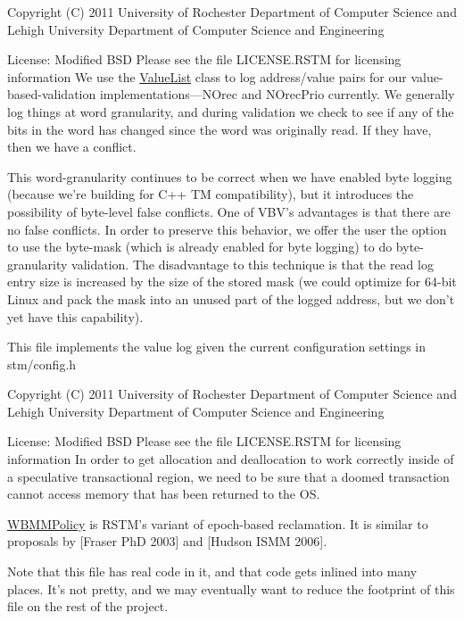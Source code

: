 Copyright (C) 2011 University of Rochester Department of Computer Science and Lehigh University Department of Computer Science and Engineering

License\-: Modified B\-S\-D Please see the file L\-I\-C\-E\-N\-S\-E.\-R\-S\-T\-M for licensing information We use the \hyperlink{structstm_1_1ValueList}{Value\-List} class to log address/value pairs for our value-\/based-\/validation implementations---N\-Orec and N\-Orec\-Prio currently. We generally log things at word granularity, and during validation we check to see if any of the bits in the word has changed since the word was originally read. If they have, then we have a conflict.

This word-\/granularity continues to be correct when we have enabled byte logging (because we're building for C++ T\-M compatibility), but it introduces the possibility of byte-\/level false conflicts. One of V\-B\-V's advantages is that there are no false conflicts. In order to preserve this behavior, we offer the user the option to use the byte-\/mask (which is already enabled for byte logging) to do byte-\/granularity validation. The disadvantage to this technique is that the read log entry size is increased by the size of the stored mask (we could optimize for 64-\/bit Linux and pack the mask into an unused part of the logged address, but we don't yet have this capability).

This file implements the value log given the current configuration settings in stm/config.\-h

Copyright (C) 2011 University of Rochester Department of Computer Science and Lehigh University Department of Computer Science and Engineering

License\-: Modified B\-S\-D Please see the file L\-I\-C\-E\-N\-S\-E.\-R\-S\-T\-M for licensing information In order to get allocation and deallocation to work correctly inside of a speculative transactional region, we need to be sure that a doomed transaction cannot access memory that has been returned to the O\-S.

\hyperlink{classstm_1_1WBMMPolicy}{W\-B\-M\-M\-Policy} is R\-S\-T\-M's variant of epoch-\/based reclamation. It is similar to proposals by \mbox{[}Fraser Ph\-D 2003\mbox{]} and \mbox{[}Hudson I\-S\-M\-M 2006\mbox{]}.

Note that this file has real code in it, and that code gets inlined into many places. It's not pretty, and we may eventually want to reduce the footprint of this file on the rest of the project.

